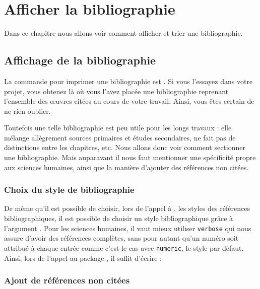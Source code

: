 \chapter{Afficher la bibliographie}

\begin{intro}

Dans ce chapitre nous allons voir comment afficher et trier une bibliographie.
\end{intro}


\section{Affichage de la bibliographie}

La commande pour imprimer une bibliographie est . Si vous l'essayez dans votre projet, vous obtenez là où vous l'avez placée une bibliographie reprenant l'ensemble des œuvres  citées au cours de votre travail. Ainsi, vous êtes certain de ne rien oublier.

Toutefois une telle bibliographie est peu utile pour les longs travaux : elle mélange allègrement sources primaires et études secondaires, ne fait pas de distinctions entre les chapitres, etc. Nous allons donc voir  comment sectionner une bibliographie. Mais auparavant il nous faut mentionner une spécificité propre aux sciences humaines, ainsi que la manière d'ajouter des références non citées.



\subsection{Choix du style de bibliographie}

De même qu'il est possible de choisir, lors de l'appel à , les styles des références bibliographiques, il est possible de choisir un style bibliographique grâce à l'argument . Pour les sciences humaines, il vaut mieux utiliser \verb|verbose| qui nous assure d'avoir des références complètes, sans pour autant qu'un numéro soit attribué à chaque entrée comme c'est le cas avec \verb|numeric|, le style par défaut.
Ainsi, lors de l'appel au package , il suffit d'écrire :

\begin{latexcode}
\usepackage[bibstyle=verbose,...]{biblatex}
\end{latexcode}

\subsection{Ajout de références non citées}

